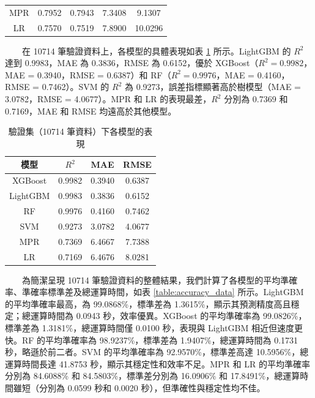 \documentclass[12pt,a4paper]{article}
\begin{document}
\begin{enumerate}
\begin{enumerate}[label=\arabic*.]
\begin{enumerate}[label=3-2-\arabic*.]
\begin{enumerate}[label=\Alph*.]
\begin{table}[H]
\begin{tabular}{|c|c|c|c|c|}
                                MPR & 0.7952 & 0.7943 & 7.3408 & 9.1307 \\
                                LR & 0.7570 & 0.7519 & 7.8900 & 10.0296 \\
                                \hline
                            \end{tabular}
                        \end{table}
                        　　在 10714 筆驗證資料上，各模型的具體表現如表 \ref{table:validation_data} 所示。LightGBM 的 \( R^2 \) 達到 0.9983，MAE 為 0.3836，RMSE 為 0.6152，優於 XGBoost（\( R^2 = 0.9982 \)，MAE = 0.3940，RMSE = 0.6387）和 RF（\( R^2 = 0.9976 \)，MAE = 0.4160，RMSE = 0.7462）。SVM 的 \( R^2 \) 為 0.9273，誤差指標顯著高於樹模型（MAE = 3.0782，RMSE = 4.0677）。MPR 和 LR 的表現最差，\( R^2 \) 分別為 0.7369 和 0.7169，MAE 和 RMSE 均遠高於其他模型。
                        \begin{table}[H]
                            \centering
                            \caption{驗證集（10714 筆資料）下各模型的表現}
                            \label{table:validation_data}
                            \begin{tabular}{|c|c|c|c|}
                                \hline
                                模型 & \( R^2 \) & MAE & RMSE \\
                                \hline
                                XGBoost & 0.9982 & 0.3940 & 0.6387 \\
                                LightGBM & 0.9983 & 0.3836 & 0.6152 \\
                                RF & 0.9976 & 0.4160 & 0.7462 \\
                                SVM & 0.9273 & 3.0782 & 4.0677 \\
                                MPR & 0.7369 & 6.4667 & 7.7388 \\
                                LR & 0.7169 & 6.4676 & 8.0281 \\
                                \hline
                            \end{tabular}
                        \end{table}
                        　　為簡潔呈現 10714 筆驗證資料的整體結果，我們計算了各模型的平均準確率、準確率標準差及總運算時間，如表 \ref{table:accuracy_data} 所示。LightGBM 的平均準確率最高，為 99.0868\%，標準差為 1.3615\%，顯示其預測精度高且穩定；總運算時間為 0.0943 秒，效率優異。XGBoost 的平均準確率為 99.0826\%，標準差為 1.3181\%，總運算時間僅 0.0100 秒，表現與 LightGBM 相近但速度更快。RF 的平均準確率為 98.9237\%，標準差為 1.9407\%，總運算時間為 0.1731 秒，略遜於前二者。SVM 的平均準確率為 92.9570\%，標準差高達 10.5956\%，總運算時間長達 41.8753 秒，顯示其穩定性和效率不足。MPR 和 LR 的平均準確率分別為 84.6088\% 和 84.5803\%，標準差分別為 16.0906\% 和 17.8491\%，總運算時間雖短（分別為 0.0599 秒和 0.0020 秒），但準確性與穩定性均不佳。

\end{enumerate}
\end{enumerate}
\end{enumerate}
\end{enumerate}
\end{document}
